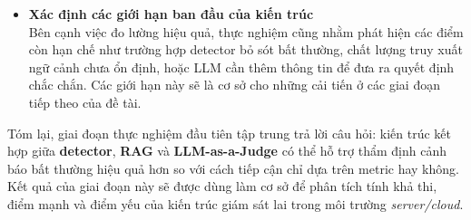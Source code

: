 \begin{itemize}[label=--]
Các chỉ số được sử dụng bao gồm Precision, Recall, F1-score, False Positive Rate, tỷ lệ giảm cảnh báo giả, số lần gọi LLM, độ trễ xử lý, tỷ lệ JSON hợp lệ và các thông tin liên quan đến token/cost. Những chỉ số này giúp đánh giá không chỉ chất lượng phân loại, mà còn khả năng vận hành của kiến trúc trong điều kiện thí nghiệm.
    \item  \textbf{Xác định các giới hạn ban đầu của kiến trúc}\\
Bên cạnh việc đo lường hiệu quả, thực nghiệm cũng nhằm phát hiện các điểm còn hạn chế như trường hợp detector bỏ sót bất thường, chất lượng truy xuất ngữ cảnh chưa ổn định, hoặc LLM cần thêm thông tin để đưa ra quyết định chắc chắn. Các giới hạn này sẽ là cơ sở cho những cải tiến ở các giai đoạn tiếp theo của đề tài.
\end{itemize}
Tóm lại, giai đoạn thực nghiệm đầu tiên tập trung trả lời câu hỏi: kiến trúc kết hợp giữa \textbf{detector},\textbf{ RAG} và\textbf{ LLM-as-a-Judge} có thể hỗ trợ thẩm định cảnh báo bất thường hiệu quả hơn so với cách tiếp cận chỉ dựa trên metric hay không. Kết quả của giai đoạn này sẽ được dùng làm cơ sở để phân tích tính khả thi, điểm mạnh và điểm yếu của kiến trúc giám sát lai trong môi trường \textit{server/cloud}.
